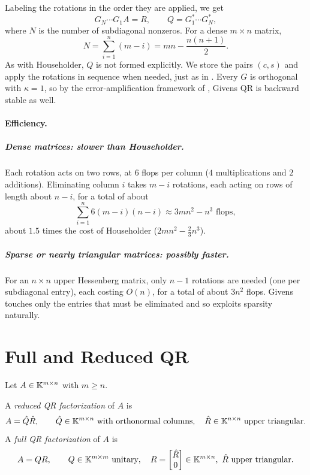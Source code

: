 Labeling the rotations in the order they are applied, we get
\begin{equation}
  G_N \cdots G_1A = R, \qquad Q = G_1^\ast \cdots G_N^\ast,
\end{equation}
where $N$ is the number of subdiagonal nonzeros. For a dense $m \times n$ matrix,
\begin{equation*}
  N = \sum_{i=1}^{n}(m - i) = mn - \frac{n(n+1)}{2}.
\end{equation*}
As with Householder, $Q$ is not formed explicitly. We store the pairs $(c, s)$ and apply the rotations in sequence when needed, just as in . Every $G$ is orthogonal with $\kappa = 1$, so by the error-amplification framework of , Givens QR is backward stable as well.

\paragraph{Efficiency.}
\subparagraph{Dense matrices: slower than Householder.} Each rotation acts on two rows, at $6$ flops per column ($4$ multiplications and $2$ additions). Eliminating column $i$ takes $m - i$ rotations, each acting on rows of length about $n - i$, for a total of about
\begin{equation}
  \sum_{i=1}^{n}6(m - i)(n - i) \approx 3mn^2 - n^3 \text{ flops},
\end{equation}
about $1.5$ times the cost of Householder ($2mn^2 - \frac{2}{3}n^3$).

\subparagraph{Sparse or nearly triangular matrices: possibly faster.} For an $n \times n$ upper Hessenberg matrix, only $n - 1$ rotations are needed (one per subdiagonal entry), each costing $O(n)$, for a total of about $3n^2$ flops. Givens touches only the entries that must be eliminated and so exploits sparsity naturally.

\clearpage
\section{Full and Reduced QR}

Let $A \in \mathbb{K}^{m \times n}$ with $m \ge n$.

\begin{definition}
  A \emph{reduced QR factorization} of $A$ is
  \begin{equation}
    A = \hat{Q}\hat{R}, \qquad \hat{Q} \in \mathbb{K}^{m \times n} \text{ with orthonormal columns}, \quad \hat{R} \in \mathbb{K}^{n \times n} \text{ upper triangular}.
  \end{equation}
  A \emph{full QR factorization} of $A$ is
  \begin{equation}
    A = QR, \qquad Q \in \mathbb{K}^{m \times m} \text{ unitary}, \quad R = \begin{bmatrix} \hat{R} \\ 0 \end{bmatrix} \in \mathbb{K}^{m \times n}, \ \hat{R} \text{ upper triangular}.
  \end{equation}
\end{definition}

